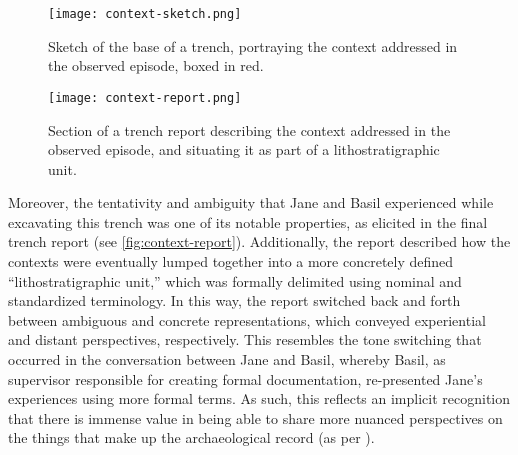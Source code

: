 
\begin{figure}[H]
\centering
\setlength{\fboxsep}{1pt}
\setlength{\fboxrule}{1pt}
\texttt{[image: context-sketch.png]}
\caption{Sketch of the base of a trench, portraying the context addressed in the observed episode, boxed in red.}
\label{fig:context-sketch}
\end{figure}



\begin{figure}[h]
\centering
\setlength{\fboxsep}{1pt}
\setlength{\fboxrule}{1pt}
\texttt{[image: context-report.png]}
\caption{Section of a trench report describing the context addressed in the observed episode, and situating it as part of a lithostratigraphic unit.}
\label{fig:context-report}
\end{figure}

Moreover, the tentativity and ambiguity that Jane and Basil experienced while excavating this trench was one of its notable properties, as elicited in the final trench report (see \autoref{fig:context-report}).
Additionally, the report described how the contexts were eventually lumped together into a more concretely defined ``lithostratigraphic unit,'' which was formally delimited using nominal and standardized terminology.
In this way, the report switched back and forth between ambiguous and concrete representations, which conveyed experiential and distant perspectives, respectively.
This resembles the tone switching that occurred in the conversation between Jane and Basil, whereby Basil, as supervisor responsible for creating formal documentation, re-presented Jane's experiences using more formal terms.
As such, this reflects an implicit recognition that there is immense value in being able to share more nuanced perspectives on the things that make up the archaeological record (as per \cite[]{batist2024a}).

